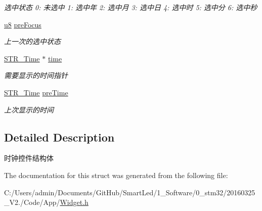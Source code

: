 \begin{DoxyCompactItemize}
\begin{DoxyCompactList}\small\item\em 选中状态 0\-: 未选中 1\-: 选中年 2\-: 选中月 3\-: 选中日 4\-: 选中时 5\-: 选中分 6\-: 选中秒 \end{DoxyCompactList}\item 
\hypertarget{struct_s_t_r___clock_a56b2126aaa45ff97f9408d5648925f68}{\hyperlink{group___b_s_p_gaed742c436da53c1080638ce6ef7d13de}{u8} \hyperlink{struct_s_t_r___clock_a56b2126aaa45ff97f9408d5648925f68}{pre\-Focus}}\label{struct_s_t_r___clock_a56b2126aaa45ff97f9408d5648925f68}

\begin{DoxyCompactList}\small\item\em 上一次的选中状态 \end{DoxyCompactList}\item 
\hypertarget{struct_s_t_r___clock_ac980407979a9f0fcb10de1b0bd0de467}{\hyperlink{struct_s_t_r___time}{\-S\-T\-R\-\_\-\-Time} $\ast$ \hyperlink{struct_s_t_r___clock_ac980407979a9f0fcb10de1b0bd0de467}{time}}\label{struct_s_t_r___clock_ac980407979a9f0fcb10de1b0bd0de467}

\begin{DoxyCompactList}\small\item\em 需要显示的时间指针 \end{DoxyCompactList}\item 
\hypertarget{struct_s_t_r___clock_a619c250be6a21c2a097ba990775eda66}{\hyperlink{struct_s_t_r___time}{\-S\-T\-R\-\_\-\-Time} \hyperlink{struct_s_t_r___clock_a619c250be6a21c2a097ba990775eda66}{pre\-Time}}\label{struct_s_t_r___clock_a619c250be6a21c2a097ba990775eda66}

\begin{DoxyCompactList}\small\item\em 上次显示的时间 \end{DoxyCompactList}\end{DoxyCompactItemize}


\subsection{\-Detailed \-Description}
时钟控件结构体 

\-The documentation for this struct was generated from the following file\-:\begin{DoxyCompactItemize}
\item 
\-C\-:/\-Users/admin/\-Documents/\-Git\-Hub/\-Smart\-Led/1\-\_\-\-Software/0\-\_\-stm32/20160325\-\_\-\-V2./\-Code/\-App/\hyperlink{_widget_8h}{\-Widget.\-h}\end{DoxyCompactItemize}
